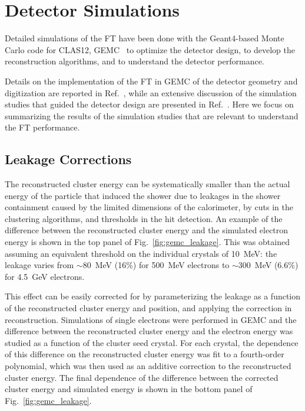 \section{Detector Simulations}

Detailed simulations of the FT have been done with the Geant4-based Monte Carlo code for CLAS12,
GEMC~\cite{gemc} to optimize the detector design, to develop the reconstruction algorithms, and to understand
the detector performance.

Details on the implementation of the FT in GEMC of the detector geometry and digitization are reported in
Ref.~\cite{gemc}, while an extensive discussion of the simulation studies that guided the detector design are
presented in Ref.~\cite{ft-tdr}. Here we focus on summarizing the results of the simulation studies that are
relevant to understand the FT performance.

\subsection{Leakage Corrections}

The reconstructed cluster energy can be systematically smaller than the actual energy of the particle that
induced the shower due to leakages in the shower containment caused by the limited dimensions of the
calorimeter, by cuts in the clustering algorithms, and thresholds in the hit detection. An example of the difference
between the reconstructed cluster energy and the simulated electron energy is shown in the top panel of
Fig.~\ref{fig:gemc_leakage}. This was obtained assuming an equivalent threshold on  the individual crystals of
10~MeV: the leakage varies from $\sim$80~MeV (16\%) for 500~MeV electrons to $\sim$300~MeV (6.6\%) for
4.5~GeV electrons.

This effect can be easily corrected for by parameterizing the leakage as a function of the reconstructed cluster
energy and position, and applying the correction in reconstruction. Simulations of single electrons were performed
in GEMC and the difference between the reconstructed cluster energy and the electron energy was studied as a
function of the cluster seed crystal. For each crystal, the dependence of this difference on the reconstructed
cluster energy was fit to a fourth-order polynomial, which was then used as an additive correction to
the reconstructed cluster energy. The final dependence of the difference between the corrected cluster energy and
simulated energy is shown in the bottom panel of Fig.~\ref{fig:gemc_leakage}.

